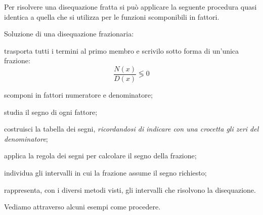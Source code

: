 Per risolvere una disequazione fratta si può applicare la seguente procedura 
quasi identica a quella che si utilizza per le funzioni scomponibili in 
fattori.

\begin{procedura}
Soluzione di una disequazione frazionaria:
\begin{enumeratea}
\item trasporta tutti i termini al primo membro e scrivilo sotto forma di 
 un'unica frazione:\\
\[\frac{N(x)}{D(x)} \lessgtr 0\]
\item scomponi in fattori numeratore e denominatore;
\item studia il segno di ogni fattore;
\item costruisci la tabella dei segni, 
\emph{ricordandosi di indicare con una crocetta gli zeri del denominatore};
\item applica la regola dei segni per calcolare il segno della frazione;
\item individua gli intervalli in cui la frazione assume il segno richiesto;
\item rappresenta, con i diversi metodi visti, gli intervalli che 
 risolvono la disequazione.
\end{enumeratea}
\end{procedura}

Vediamo attraverso alcuni esempi come procedere.

